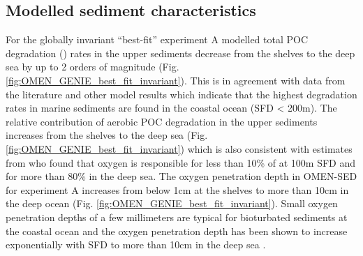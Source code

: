 \documentclass[gmd, manuscript]{copernicus}
\begin{document}
\subsection{Modelled sediment characteristics}
For the globally invariant ``best-fit'' experiment A modelled total POC degradation () rates in the upper sediments decrease from the 
shelves to the deep sea by up to 2 orders of magnitude (Fig. \ref{fig:OMEN_GENIE_best_fit_invariant}). 
This is in agreement with data from the literature \citep[e.g.][]{middelburg_organic_1993, middelburg_empirical_1997} and other model results 
\citep[e.g.][]{thullner_global_scale_2009} which indicate that the highest degradation rates in marine sediments are found in the coastal ocean (SFD < 200m). 
The relative contribution of aerobic POC degradation in the upper sediments increases from the shelves to the deep sea (Fig. \ref{fig:OMEN_GENIE_best_fit_invariant}) 
which is also consistent with estimates from %
\citet{thullner_global_scale_2009} who found that oxygen is responsible for less than 10\% of  at 100m SFD and for more 
than 80\% in the deep sea. 
The oxygen penetration depth in OMEN-SED for experiment A increases from below 1cm at the shelves to more than 10cm in the deep ocean (Fig. \ref{fig:OMEN_GENIE_best_fit_invariant}).
Small oxygen penetration depths of a few millimeters are typical for bioturbated sediments at the coastal ocean \citep[e.g.][]{wenzhofer_benthic_2002} and 
the oxygen penetration depth has been shown to increase exponentially with SFD to more than 10cm in the deep sea \citep{glud_oxygen_2008}. 
\end{document}
